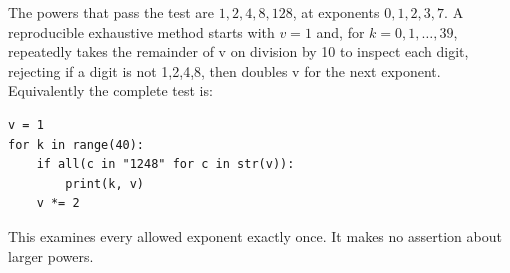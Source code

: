 The powers that pass the test are $\boxed{1,2,4,8,128}$, at exponents $0,1,2,3,7$. A reproducible exhaustive method starts with $v=1$ and, for $k=0,1,\ldots,39$, repeatedly takes the remainder of v on division by 10 to inspect each digit, rejecting if a digit is not 1,2,4,8, then doubles v for the next exponent. Equivalently the complete test is:\begin{verbatim}
v = 1
for k in range(40):
    if all(c in "1248" for c in str(v)):
        print(k, v)
    v *= 2
\end{verbatim}
This examines every allowed exponent exactly once. It makes no assertion about larger powers.
